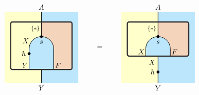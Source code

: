 \[
 \begin{tikzpicture}[x=0.6cm,y=0.6cm, baseline=(current bounding box.center), line width=0.7pt]
    \definecolor{leftcolor}{RGB}{255,255,204}
    \definecolor{rightcolor}{HTML}{BBE6FB}
    \definecolor{midcolor}{HTML}{F5D4BC}

    \node at (4.75, 1.1) {$=$};
  
    \begin{scope}[shift={(9.5,0)}]
   \fill[fill=leftcolor] (-3,-1.8) rectangle (0,4); 
     \fill[fill=rightcolor] (0, -1.8) rectangle (3,4); 
        \begin{scope} 
            \clip (-2.5,0.4) rectangle (2.5, 3.2);     
            \fill[fill=leftcolor] (-2.5,0) rectangle (0, 3.2);  
            \fill[fill=midcolor] (0,0) rectangle (2.5, 3.2);  
            \draw[fill=rightcolor, rounded corners=0.6cm] (-1, -2) rectangle (1, 2);
        \end{scope}
        \node[shift={(-0.35,0.35)}] at (-1, 0.4) {$X$};
        \node[shift={(0.35,0.35)}] at (1, 0.4) {$F$};
        \node[below=2pt] at (0, 2) {$s$};
        \draw[fill=black] (0, 2) circle (0.1);  
        \draw (0,4) -- (0,2);
        \draw (0, -1.8) -- (0,0.4);
        \node[below,shift={(-0.5,0.1)}] at (0, 3) {\scalebox{.8}{$\{*\}$}};
        \draw[line width=1.7pt, color=black!80, rounded corners=2.5pt] (-2.5, 0.4) rectangle (2.5, 3.2); %
        \node[above] at (0, 4){$A$};
        \node[left] at (0, -0.1){$X$};
        \node[below] at (0, -1.8){$Y$};
        \filldraw [black] (0, -0.9) circle (0.1) node[left=1pt] {$h$};
    \end{scope}

    \begin{scope}
   \fill[fill=leftcolor] (-3,-1.8) rectangle (0,4); 
     \fill[fill=rightcolor] (0, -1.8) rectangle (3,4); 
        \begin{scope} 
            \clip (-2.5,-0.7) rectangle (2.5, 3.2);     
            \fill[fill=leftcolor] (-2.5,0) rectangle (0, 3.2);  
            \fill[fill=midcolor] (0,-1) rectangle (2.5, 3.2);  
            \draw[fill=rightcolor, rounded corners=0.6cm] (-1, -2) rectangle (1, 2);
        \end{scope}
        \node[shift={(-0.35,0.35)}] at (-1, -0.7) {$Y$};
        \node[shift={(0.35,0.35)}] at (1, -0.7) {$F$};
        \node[below=2pt] at (0, 2) {$s$};
        \draw[fill=black] (0, 2) circle (0.1);  
        \draw (0,4) -- (0,2);
        \draw (0, -1.8) -- (0, -0.7);
        \node[below,shift={(-0.5,0.1)}] at (0, 3) {\scalebox{.8}{$\{*\}$}};
        \draw[line width=1.7pt, color=black!80, rounded corners=2.5pt] (-2.5, -0.7) rectangle (2.5, 3.2); %
        \node[above] at (0, 4){$A$};
        \node[left] at (-0.8, 1.65){$X$};
        \node[below] at (0, -1.8){$Y$};
        \filldraw [black] (-1, 0.6) circle (0.1) node[left=1pt] {$h$};
    \end{scope}   
    \end{tikzpicture}
\]


